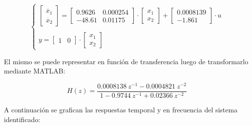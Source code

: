 \vspace{-0.5cm}
\begin{equation}
    \begin{cases}
        \begin{bmatrix}
            \dot{x_1}   \\
            \dot{x_2}   
        \end{bmatrix}
        =

        \begin{bmatrix}
            0.9626   &   0.000254 \\
            -48.61   &  0.01175           
        \end{bmatrix}

        \cdot
        \begin{bmatrix}
            x_1 \\
            x_2 
        \end{bmatrix}
        +
        \begin{bmatrix}
            0.0008139 \\
            -1.861           
        \end{bmatrix}
        \cdot
        u 
        \\
        \\
        y =
        \begin{bmatrix}
            1 & 0
        \end{bmatrix}
        \cdot
        \begin{bmatrix}
            x_1 \\
            x_2
        \end{bmatrix}

    \end{cases}
    \label{eq:modelo_discreto}
\end{equation}
\vspace{-0.5cm}

El mismo se puede representar en función de transferencia luego de transformarlo mediante MATLAB:   

\vspace{-0.5cm}
\begin{equation}
    H(z) = \dfrac{0.0008138\ z^{-1} - 0.0004821\ z^{-2}}{1 - 0.9744\ z^{-1} + 0.02366\ z^{-2}}
\end{equation}
\vspace{-0.5cm}

A continuación se grafican las respuestas temporal y en frecuencia del sistema identificado:

